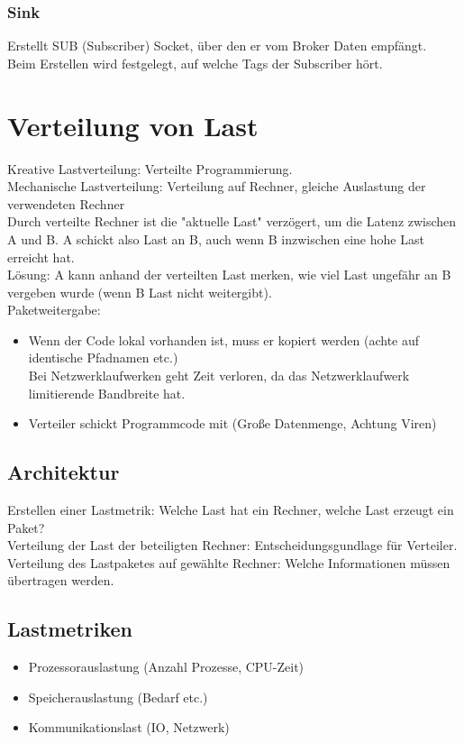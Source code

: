 \documentclass[a4paper]{article}
\begin{document}
\subsubsection{Sink}
Erstellt SUB (Subscriber) Socket, über den er vom Broker Daten empfängt. \\
Beim Erstellen wird festgelegt, auf welche Tags der Subscriber hört.\\
\section{Verteilung von Last}

Kreative Lastverteilung: Verteilte Programmierung.\\
Mechanische Lastverteilung: Verteilung auf Rechner, gleiche Auslastung der verwendeten Rechner\\

Durch verteilte Rechner ist die "aktuelle Last" verzögert, um die Latenz zwischen A und B. A schickt also Last an B, auch wenn B inzwischen eine hohe Last erreicht hat.\\
Lösung: A kann anhand der verteilten Last merken, wie viel Last ungefähr an B vergeben wurde (wenn B Last nicht weitergibt).\\

Paketweitergabe:\\
\begin{itemize}
\item Wenn der Code lokal vorhanden ist, muss er kopiert werden (achte auf identische Pfadnamen etc.)\\
	Bei Netzwerklaufwerken geht Zeit verloren, da das Netzwerklaufwerk limitierende Bandbreite hat.
\item Verteiler schickt Programmcode mit (Große Datenmenge, Achtung Viren)

\end{itemize}

\subsection{Architektur}
Erstellen einer Lastmetrik: Welche Last hat ein Rechner, welche Last erzeugt ein Paket?\\
Verteilung der Last der beteiligten Rechner: Entscheidungsgundlage für Verteiler.\\
Verteilung des Lastpaketes auf gewählte Rechner: Welche Informationen müssen übertragen werden.\\
\subsection*{Lastmetriken}
\begin{itemize}
\item Prozessorauslastung (Anzahl Prozesse, CPU-Zeit)
\item Speicherauslastung (Bedarf etc.)
\item Kommunikationslast (IO, Netzwerk)
\end{itemize}
\end{document}
